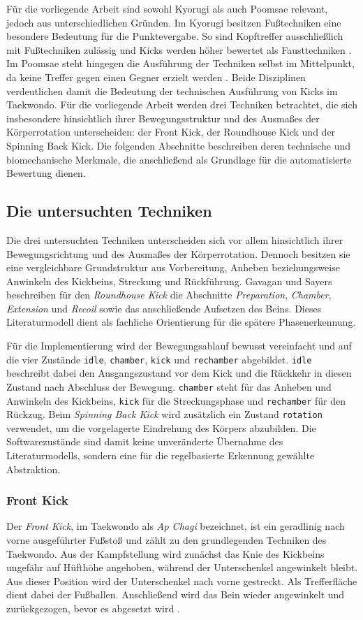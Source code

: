 \documentclass[intern]{cgMA}
\begin{document}
Für die vorliegende Arbeit sind sowohl Kyorugi als auch Poomsae relevant, jedoch aus unterschiedlichen Gründen. Im Kyorugi besitzen Fußtechniken eine besondere Bedeutung für die Punktevergabe. So sind Kopftreffer ausschließlich mit Fußtechniken zulässig und Kicks werden höher bewertet als Fausttechniken \cite{WTKyorugi2026}. Im Poomsae steht hingegen die Ausführung der Techniken selbst im Mittelpunkt, da keine Treffer gegen einen Gegner erzielt werden \cite{WTPoomsae2024}. Beide Disziplinen verdeutlichen damit die Bedeutung der technischen Ausführung von Kicks im Taekwondo.
Für die vorliegende Arbeit werden drei Techniken betrachtet, die sich insbesondere hinsichtlich ihrer Bewegungsstruktur und des Ausmaßes der Körperrotation unterscheiden: der Front Kick, der Roundhouse Kick und der Spinning Back Kick. Die folgenden Abschnitte beschreiben deren technische und biomechanische Merkmale, die anschließend als Grundlage für die automatisierte Bewertung dienen.
\subsection{Die untersuchten Techniken}
Die drei untersuchten Techniken unterscheiden sich vor allem hinsichtlich ihrer Bewegungsrichtung und des Ausmaßes der Körperrotation. Dennoch besitzen sie eine vergleichbare Grundstruktur aus Vorbereitung, Anheben beziehungsweise Anwinkeln des Kickbeins, Streckung und Rückführung. Gavagan und Sayers \cite{Gavagan2017} beschreiben für den \textit{Roundhouse Kick} die Abschnitte \textit{Preparation}, \textit{Chamber}, \textit{Extension} und \textit{Recoil} sowie das anschließende Aufsetzen des Beins. Dieses Literaturmodell dient als fachliche Orientierung für die spätere Phasenerkennung.

Für die Implementierung wird der Bewegungsablauf bewusst vereinfacht und auf die vier Zustände \texttt{idle}, \texttt{chamber}, \texttt{kick} und \texttt{rechamber} abgebildet. \texttt{idle} beschreibt dabei den Ausgangszustand vor dem Kick und die Rückkehr in diesen Zustand nach Abschluss der Bewegung. \texttt{chamber} steht für das Anheben und Anwinkeln des Kickbeins, \texttt{kick} für die Streckungsphase und \texttt{rechamber} für den Rückzug. Beim \textit{Spinning Back Kick} wird zusätzlich ein Zustand \texttt{rotation} verwendet, um die vorgelagerte Eindrehung des Körpers abzubilden. Die Softwarezustände sind damit keine unveränderte Übernahme des Literaturmodells, sondern eine für die regelbasierte Erkennung gewählte Abstraktion.

\subsubsection{Front Kick}
Der \textit{Front Kick}, im Taekwondo als \textit{Ap Chagi} bezeichnet, ist ein geradlinig nach vorne ausgeführter Fußstoß und zählt zu den grundlegenden Techniken des Taekwondo. Aus der Kampfstellung wird zunächst das Knie des Kickbeins ungefähr auf Hüfthöhe angehoben, während der Unterschenkel angewinkelt bleibt. Aus dieser Position wird der Unterschenkel nach vorne gestreckt. Als Trefferfläche dient dabei der Fußballen. Anschließend wird das Bein wieder angewinkelt und zurückgezogen, bevor es abgesetzt wird \cite{Gulia2022}.
\end{document}
